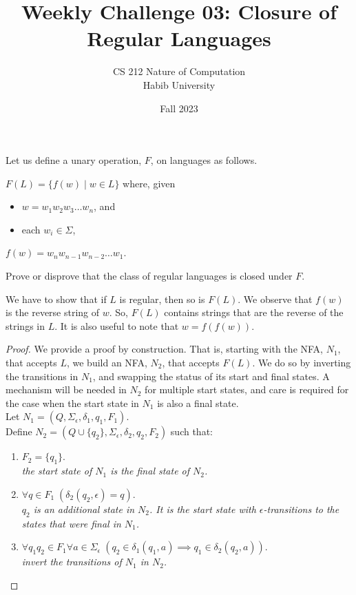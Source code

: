 \documentclass[a4paper]{exam}
\title{Weekly Challenge 03: Closure of Regular Languages}
\author{CS 212 Nature of Computation\\Habib University}
\date{Fall 2023}
\begin{document}
\maketitle

\begin{questions}
  

  Let us define a unary operation, $F$, on languages as follows.
  
  \begin{mdframed}
    $F(L) = \{ f(w) \mid w\in L\}$ where, given
    \begin{itemize}
    \item $w=w_1w_2w_3\ldots w_n$, and
    \item each $w_i\in\Sigma$,
    \end{itemize}
    $f(w) = w_nw_{n-1}w_{n-2}\ldots w_1$.
  \end{mdframed}

  Prove or disprove that the class of regular languages is closed under $F$.

  \begin{solution}
    We have to show that if $L$ is regular, then so is $F(L)$. We observe that $f(w)$ is the reverse string of $w$. So, $F(L)$ contains strings that are the reverse of the strings in $L$. It is also useful to note that $w=f(f(w))$.
    
    \begin{proof}
      We provide a proof by construction. That is, starting with the NFA, $N_1$, that accepts $L$, we build an NFA, $N_2$, that accepts $F(L)$. We do so by inverting the transitions in $N_1$, and swapping the status of its start and final states. A mechanism will be needed in $N_2$ for multiple start states, and care is required for the case when the start state in $N_1$ is also a final state.\\
      
      Let $N_1 = (Q,\Sigma_\epsilon,\delta_1,q_1, F_1)$.\\
      Define $N_2 = (Q\cup \{q_2\},\Sigma_\epsilon,\delta_2,q_2, F_2)$ such that:
      \begin{enumerate}
      \item $F_2=\{ q_1\}$.\\
        \textit{the start state of $N_1$ is the final state of $N_2$.}
      \item $\forall q\in F_1\; (\delta_2(q_2,\epsilon) = q)$.\\
        \textit{$q_2$ is an additional state in $N_2$. It is the start state with $\epsilon$-transitions to the states that were final in $N_1$.}
      \item $\forall q_1q_2\in F_1\forall a \in \Sigma_\epsilon\; (q_2\in \delta_1(q_1,a) \implies q_1\in\delta_2(q_2,a))$.\\
        \textit{invert the transitions of $N_1$ in $N_2$.}
      \end{enumerate}
    \end{proof}


\end{solution}
\end{questions}
\end{document}
